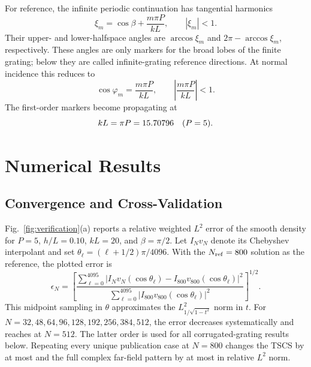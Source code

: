 \documentclass[conference]{IEEEtran}
\begin{document}
 For reference, the infinite periodic continuation has tangential harmonics
\begin{equation}
 \xi_m=\cos\beta+\frac{m\pi P}{kL},\qquad |\xi_m|<1.                    \label{eq:floquet}
\end{equation}
Their upper- and lower-halfspace angles are $\arccos\xi_m$ and
$2\pi-\arccos\xi_m$, respectively.  These angles are only markers for the
broad lobes of the finite grating; below they are called infinite-grating
reference directions.  At normal incidence this reduces to
\begin{equation}
 \cos\varphi_m=\frac{m\pi P}{kL},\qquad
 \left|\frac{m\pi P}{kL}\right|<1.                                    \label{eq:floquetnormal}
\end{equation}
The first-order
markers become propagating at
\begin{equation}
 kL=\pi P=15.70796 \quad (P=5).                                 \label{eq:cutoff}
\end{equation}

\section{Numerical Results}
\label{sec:results}

\subsection{Convergence and Cross-Validation}

Fig.~\ref{fig:verification}(a) reports a relative weighted $L^2$ error of
the smooth density for $P=5$, $h/L=0.10$, $kL=20$, and $\beta=\pi/2$.  Let
$I_Nv_N$ denote its Chebyshev interpolant and set
$\theta_\ell=(\ell+1/2)\pi/4096$.  With the $N_{\rm ref}=800$ solution as the
reference, the plotted error is
\begin{equation}
 \epsilon_N=\left[
 \frac{\sum_{\ell=0}^{4095}|I_Nv_N(\cos\theta_\ell)
       -I_{800}v_{800}(\cos\theta_\ell)|^2}
      {\sum_{\ell=0}^{4095}|I_{800}v_{800}(\cos\theta_\ell)|^2}
 \right]^{1/2}.
 \label{eq:l2error}
\end{equation}
This midpoint sampling in $\theta$ approximates the
$L^2_{1/\sqrt{1-t^2}}$ norm in $t$.  For
$N=32,48,64,96,128,192,256,384,512$, the error decreases systematically and
reaches \ConvErrorNFiveTwelve at $N=512$.  The latter order is used for all
corrugated-grating results below.  Repeating every unique publication case at
$N=800$ changes the TSCS by at most \ProductionMaxTSCSChange and the full
complex far-field pattern by at most \ProductionMaxPatternChange in relative
$L^2$ norm.
\end{document}
